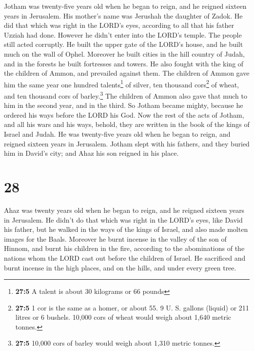  Jotham was twenty-five years old when he began to reign,
and he reigned sixteen years in Jerusalem. His mother's name was
Jerushah the daughter of Zadok.  He did that which was
right in the LORD's eyes, according to all that his father Uzziah had
done. However he didn't enter into the LORD's temple. The people still
acted corruptly.  He built the upper gate of the LORD's
house, and he built much on the wall of Ophel.  Moreover
he built cities in the hill country of Judah, and in the forests he
built fortresses and towers.  He also fought with the king
of the children of Ammon, and prevailed against them. The children of
Ammon gave him the same year one hundred talents\footnote{\textbf{27:5}
  A talent is about 30 kilograms or 66 pounds} of silver, ten thousand
cors\footnote{\textbf{27:5} 1 cor is the same as a homer, or about 55. 9
  U. S. gallons (liquid) or 211 litres or 6 bushels. 10,000 cors of
  wheat would weigh about 1,640 metric tonnes.} of wheat, and ten
thousand cors of barley.\footnote{\textbf{27:5} 10,000 cors of barley
  would weigh about 1,310 metric tonnes.} The children of Ammon also
gave that much to him in the second year, and in the third.
 So Jotham became mighty, because he ordered his ways
before the LORD his God.  Now the rest of the acts of
Jotham, and all his wars and his ways, behold, they are written in the
book of the kings of Israel and Judah.  He was twenty-five
years old when he began to reign, and reigned sixteen years in
Jerusalem.  Jotham slept with his fathers, and they buried
him in David's city; and Ahaz his son reigned in his place.

\hypertarget{section-27}{%
\section{28}\label{section-27}}

 Ahaz was twenty years old when he began to reign, and he
reigned sixteen years in Jerusalem. He didn't do that which was right in
the LORD's eyes, like David his father,  but he walked in
the ways of the kings of Israel, and also made molten images for the
Baals.  Moreover he burnt incense in the valley of the son
of Hinnom, and burnt his children in the fire, according to the
abominations of the nations whom the LORD cast out before the children
of Israel.  He sacrificed and burnt incense in the high
places, and on the hills, and under every green tree.

